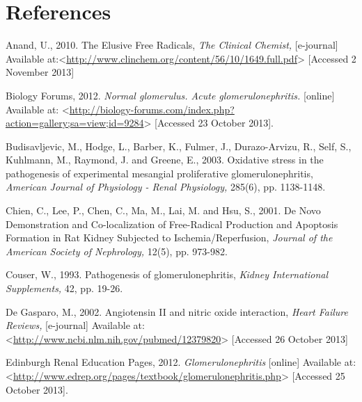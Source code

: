 \documentclass[12pt]{report}
\begin{document}
\section*{References}

Anand, U., 2010. The Elusive Free Radicals, \textit{The Clinical Chemist,} [e-journal] Available at:<\url{http://www.clinchem.org/content/56/10/1649.full.pdf}> [Accessed 2 November 2013]
\newline
\newline

Biology Forums, 2012. \textit{Normal glomerulus. Acute glomerulonephritis.} [online] Available at: <\url{http://biology-forums.com/index.php?action=gallery;sa=view;id=9284}> [Accessed 23 October 2013].
\newline
\newline

Budisavljevic, M., Hodge, L., Barber, K., Fulmer, J., Durazo-Arvizu, R., Self, S., Kuhlmann, M., Raymond, J. and Greene, E., 2003. Oxidative stress in the pathogenesis of experimental mesangial proliferative glomerulonephritis, \textit{American Journal of Physiology - Renal Physiology,} 285(6), pp. 1138-1148.
\newline
\newline

Chien, C., Lee, P., Chen, C., Ma, M., Lai, M. and Hsu, S., 2001. De Novo Demonstration and Co-localization of Free-Radical Production and Apoptosis Formation in Rat Kidney Subjected to Ischemia/Reperfusion, \textit{Journal of the American Society of Nephrology,} 12(5), pp. 973-982.
\newline
\newline

Couser, W., 1993. Pathogenesis of glomerulonephritis, \textit{Kidney International Supplements,} 42, pp. 19-26.
\newline
\newline

De Gasparo, M., 2002. Angiotensin II and nitric oxide interaction, \textit{Heart Failure Reviews,} [e-journal] Available at:<\url{http://www.ncbi.nlm.nih.gov/pubmed/12379820}> [Accessed 26 October 2013]
\newline
\newline

Edinburgh Renal Education Pages, 2012. \textit{Glomerulonephritis} [online] Available at: <\url{http://www.edrep.org/pages/textbook/glomerulonephritis.php}> [Accessed 25 October 2013].
\newline
\newline
\end{document}
